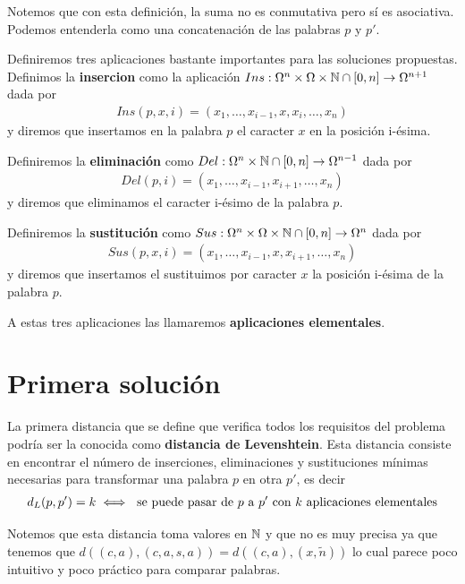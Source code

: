 \documentclass[12pt]{article}
\begin{document}
Notemos que con esta definición, la suma no es conmutativa pero sí es asociativa. Podemos entenderla como una concatenación de las palabras $p$ y $p'$. 

Definiremos tres aplicaciones bastante importantes para las soluciones propuestas.
Definimos la \textbf{insercion} como la aplicación $Ins:\Omega^n \times \Omega \times \mathbb{N}\cap [0,n] \to \Omega^{n+1}$ dada por 
\begin{align*}
    Ins(p,x,i) = (x_1, \dots, x_{i-1}, x, x_i, \dots, x_n)
\end{align*}
y diremos que insertamos en la palabra $p$ el caracter $x$ en la posición i-ésima.

Definiremos la \textbf{eliminación} como $Del:\Omega^n \times \mathbb{N}\cap [0,n] \to \Omega^{n-1}$ dada por
\begin{align*}
    Del(p,i) = (x_1,\dots,x_{i-1}, x_{i+1}, \dots, x_n)
\end{align*}
y diremos que eliminamos el caracter i-ésimo de la palabra $p$.

Definiremos la \textbf{sustitución} como $Sus:\Omega^n \times \Omega \times \mathbb{N}\cap [0,n] \to \Omega^n$ dada por
\begin{align*}
    Sus(p,x,i) = (x_1, \dots, x_{i-1}, x, x_{i+1}, \dots, x_n)
\end{align*}
y diremos que insertamos el sustituimos por caracter $x$ la posición i-ésima de la palabra $p$.

A estas tres aplicaciones las llamaremos \textbf{aplicaciones elementales}.

\section{Primera solución}

La primera distancia que se define que verifica todos los requisitos del problema podría ser la conocida como \textbf{ distancia de Levenshtein}. Esta distancia consiste en encontrar el número de inserciones, eliminaciones y sustituciones mínimas necesarias para transformar una palabra $p$ en otra $p'$, es decir
\begin{align*}
    d_L(p,p')=k \iff \text{ se puede pasar de $p$ a $p'$ con $k$ aplicaciones elementales}
\end{align*}

Notemos que esta distancia toma valores en $\mathbb{N}$ y que no es muy precisa ya que tenemos que $d((c,a), (c,a,s,a)) = d((c,a), (x,\tilde{n}))$ lo cual parece poco intuitivo y poco práctico para comparar palabras.
\end{document}
